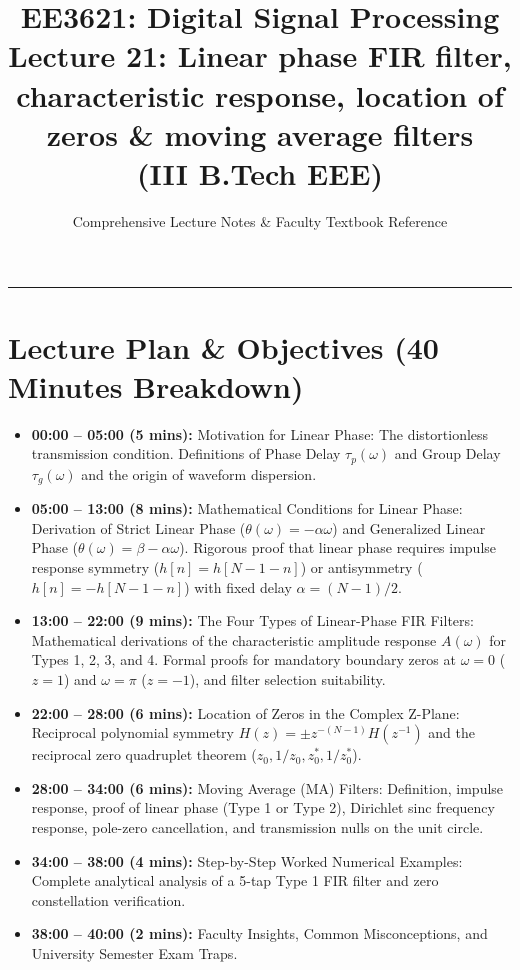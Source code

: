 \documentclass[11pt,a4paper]{article}
\title{\textbf{EE3621: Digital Signal Processing} \\ \Large Lecture 21: Linear phase FIR filter, characteristic response, location of zeros \& moving average filters \\ \large (III B.Tech EEE)}
\author{Comprehensive Lecture Notes \& Faculty Textbook Reference}
\date{}
\begin{document}
\maketitle

\noindent\rule{\textwidth}{0.5pt}

\section*{Lecture Plan \& Objectives (40 Minutes Breakdown)}
\begin{itemize}
    \item \textbf{00:00 -- 05:00 (5 mins):} Motivation for Linear Phase: The distortionless transmission condition. Definitions of Phase Delay $\tau_p(\omega)$ and Group Delay $\tau_g(\omega)$ and the origin of waveform dispersion.
    \item \textbf{05:00 -- 13:00 (8 mins):} Mathematical Conditions for Linear Phase: Derivation of Strict Linear Phase ($\theta(\omega) = -\alpha \omega$) and Generalized Linear Phase ($\theta(\omega) = \beta - \alpha \omega$). Rigorous proof that linear phase requires impulse response symmetry ($h[n] = h[N-1-n]$) or antisymmetry ($h[n] = -h[N-1-n]$) with fixed delay $\alpha = (N-1)/2$.
    \item \textbf{13:00 -- 22:00 (9 mins):} The Four Types of Linear-Phase FIR Filters: Mathematical derivations of the characteristic amplitude response $A(\omega)$ for Types 1, 2, 3, and 4. Formal proofs for mandatory boundary zeros at $\omega = 0$ ($z = 1$) and $\omega = \pi$ ($z = -1$), and filter selection suitability.
    \item \textbf{22:00 -- 28:00 (6 mins):} Location of Zeros in the Complex Z-Plane: Reciprocal polynomial symmetry $H(z) = \pm z^{-(N-1)} H(z^{-1})$ and the reciprocal zero quadruplet theorem ($z_0, 1/z_0, z_0^*, 1/z_0^*$).
    \item \textbf{28:00 -- 34:00 (6 mins):} Moving Average (MA) Filters: Definition, impulse response, proof of linear phase (Type 1 or Type 2), Dirichlet sinc frequency response, pole-zero cancellation, and transmission nulls on the unit circle.
    \item \textbf{34:00 -- 38:00 (4 mins):} Step-by-Step Worked Numerical Examples: Complete analytical analysis of a 5-tap Type 1 FIR filter and zero constellation verification.
    \item \textbf{38:00 -- 40:00 (2 mins):} Faculty Insights, Common Misconceptions, and University Semester Exam Traps.
\end{itemize}
\end{document}
